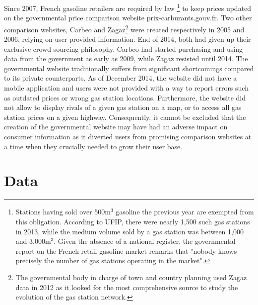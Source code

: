 \documentclass[english]{article}
\begin{document}
Since 2007, French gasoline retailers are required by law%
\footnote{Stations having sold over 500m$^{3}$ gasoline the previous year are exempted from this obligation. According to UFIP, there were nearly 1,500 such gas stations in 2013, while the medium volume sold by a gas station was between 1,000 and 3,000m$^{3}$. Given the absence of a national register, the governmental report \cite{BEL12} on the French retail gasoline market remarks that "nobody knows precisely the number of gas stations operating in the market".}%
to keep prices updated on the governmental price comparison website prix-carburants.gouv.fr. Two other comparison websites, Carbeo and Zagaz\footnote{The governmental body in charge of town and country planning used Zagaz data in 2012 as it looked for the most comprehensive source to study the evolution of the gas station network.} were created respectively in 2005 and 2006, relying on user provided information. End of 2014, both had given up their exclusive crowd-sourcing philosophy. Carbeo had started purchasing and using data from the government as early as 2009, while Zagaz resisted until 2014. The governmental website traditionally suffers from significant shortcomings compared to its private counterparts. As of December 2014, the website did not have a mobile application and users were not provided with a way to report errors such as outdated prices or wrong gas station locations. Furthermore, the website did not allow to display rivals of a given gas station on a map, or to access all gas station prices on a given highway. Consequently, it cannot be excluded that the creation of the governmental website may have had an adverse impact on consumer information as it diverted users from promising comparison websites at a time when they crucially needed to grow their user base.


\section{Data}
\end{document}
